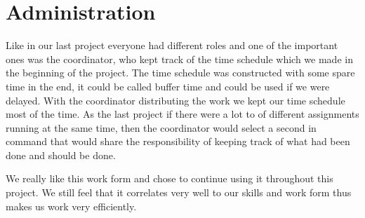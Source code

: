 \section{Administration}
Like in our last project everyone had different roles and one of the important ones was the coordinator, who kept track of the time schedule which we made in the beginning of the project. The time schedule was constructed with some spare time in the end, it could be called buffer time and could be used if we were delayed. With the coordinator distributing the work we kept our time schedule most of the time. As the last project if there were a lot to of different assignments running at the same time, then the coordinator would select a second in command that would share the responsibility of keeping track of what had been done and should be done.

We really like this work form and chose to continue using it throughout this project. We still feel that it correlates very well to our skills and work form thus makes us work very efficiently.